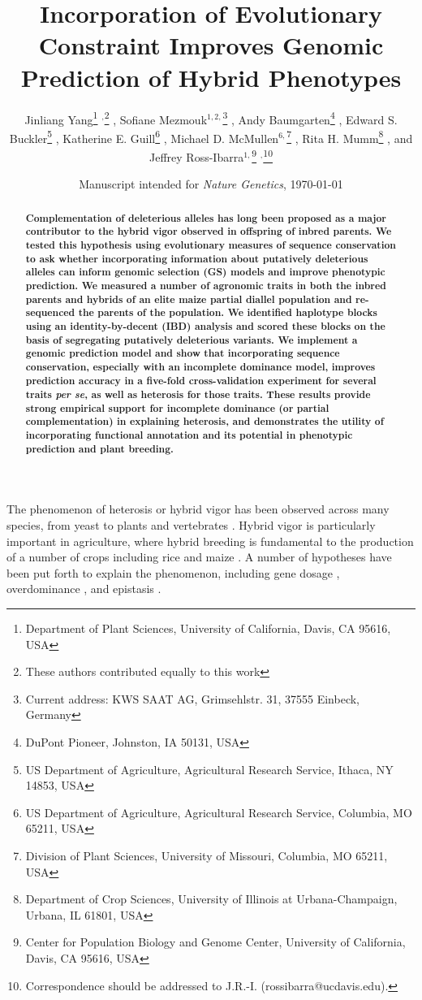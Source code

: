 \documentclass[twoside, twocolumn, letterpaper]{article}
\title{Incorporation of Evolutionary Constraint Improves Genomic Prediction of Hybrid Phenotypes}
\author{
Jinliang Yang\thanks{Department of Plant Sciences, University of California, Davis, CA 95616, USA} $^,$\thanks{These authors contributed equally to this work} \hspace{0.5mm}, 
Sofiane Mezmouk$^{1,2,}$\thanks{Current address: KWS SAAT AG, Grimsehlstr. 31, 37555 Einbeck, Germany} \hspace{0.5mm}, 
Andy Baumgarten\thanks{DuPont Pioneer, Johnston, IA 50131, USA} \hspace{0.5mm}, 
Edward S. Buckler\thanks{US Department of Agriculture, Agricultural Research Service, Ithaca, NY 14853, USA} \hspace{0.5mm}, 
Katherine E. Guill\thanks{US Department of Agriculture, Agricultural Research Service, Columbia, MO 65211, USA} \hspace{0.5mm},
Michael D. McMullen$^{6,}$\thanks{Division of Plant Sciences, University of Missouri, Columbia, MO 65211, USA} \hspace{0.5mm},
Rita H. Mumm\thanks{Department of Crop Sciences, University of Illinois at Urbana-Champaign, Urbana, IL 61801, USA} \hspace{0.5mm},
and Jeffrey Ross-Ibarra$^{1,}$\thanks{Center for Population Biology and Genome Center, University of California, Davis, CA 95616, USA} $^,$\thanks{Correspondence should be addressed to J.R.-I. (rossibarra@ucdavis.edu).}\hspace{0.5mm}
}
\date{\small Manuscript intended for \emph{Nature Genetics}, \today}
\begin{document}
 
\maketitle


\begin{abstract}
\noindent \bf
\noindent
Complementation of deleterious alleles has long been proposed as a major contributor to the hybrid vigor observed in offspring of inbred parents. 
We tested this hypothesis using evolutionary measures of sequence conservation to ask whether incorporating information about putatively deleterious alleles can inform genomic selection (GS) models and improve phenotypic prediction.
We measured a number of agronomic traits in both the inbred parents and hybrids of an elite maize partial diallel population and re-sequenced the parents of the population. 
We identified haplotype blocks using an identity-by-decent (IBD) analysis and scored these blocks on the basis of segregating putatively deleterious variants. 
We implement a genomic prediction model and show that incorporating sequence conservation, especially with an incomplete dominance model, improves prediction accuracy in a five-fold cross-validation experiment for several traits \emph{per se}, as well as heterosis for those traits. 
These results provide strong empirical support for incomplete dominance (or partial complementation) in explaining heterosis, and demonstrates the utility of incorporating functional annotation and its potential in phenotypic prediction and plant breeding.
\end{abstract}

\vspace{6mm}

\noindent %
The phenomenon of heterosis or hybrid vigor has been observed across many species, from yeast \citep{Shapira2014} to plants \citep{shull1908composition} and vertebrates \citep{Gama2013}. 
Hybrid vigor is particularly important in agriculture, where hybrid breeding is fundamental to the production of a number of crops including rice \citep{virmani1982heterosis} and maize \citep{east1936heterosis, shull1946hybrid}.
A number of hypotheses have been put forth to explain the phenomenon, including gene dosage \citep{birchler2003search}, overdominance \citep{east1936heterosis, schwartz1973single, krieger2010flowering, frascaroli2007classical}, 
and epistasis \citep{minvielle1987dominance, schnell1992multiplicative}. 
\end{document}
